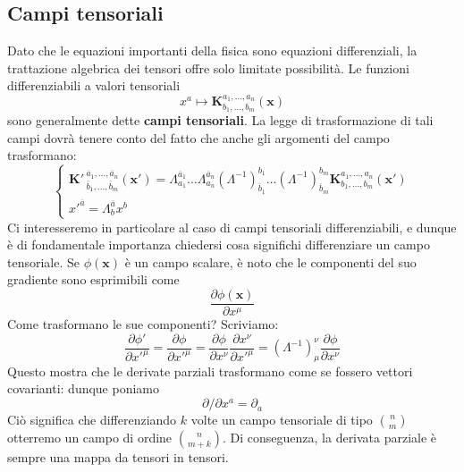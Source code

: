\documentclass[a4paper,11pt]{book}
\theoremstyle{plain}
\theoremstyle{definition}
\begin{document}
\subsection{Campi tensoriali}
Dato che le equazioni importanti della fisica sono equazioni differenziali, la trattazione 
algebrica dei tensori offre solo limitate possibilità. Le funzioni differenziabili a valori 
tensoriali 
\[
x^a \mapsto \textbf{K}^{a_1,\ldots,a_n}_{b_1,\ldots,b_m}(\textbf{x})
\]
sono generalmente dette \textbf{campi tensoriali}. La legge di trasformazione di tali campi dovrà tenere conto del fatto che anche gli argomenti del campo trasformano:
\[
\begin{cases}
\textbf{K}'\,^{\overline{a}_1,\ldots,\overline{a}_n}_{\overline{b}_1,\ldots,\overline{b}_m}(\textbf{x}') = \Lambda_{a_1}^{\overline{a}_1}\ldots\Lambda^{\overline{a}_n}_{a_n}(\Lambda^{-1})_{\overline{b}_1}^{b_1}\ldots(\Lambda^{-1})^{b_m}_{\overline{b}_m}\textbf{K}^{a_1,\ldots,a_n}_{b_1,\ldots,b_m}(\textbf{x}') \\
x'^{\overline{a}}=\Lambda_b^{\overline{a}}x^b
\end{cases}
\]
Ci interesseremo in particolare al caso di campi tensoriali differenziabili, e dunque è di fondamentale importanza chiedersi cosa significhi differenziare un campo tensoriale. Se $\phi (\textbf{x})$ è un campo scalare, è noto che le componenti del suo gradiente sono esprimibili come 
\[
\frac{\partial \phi(\textbf{x})}{\partial x^{\mu}}
\]
Come trasformano le sue componenti? Scriviamo:
\[
\frac{\partial \phi'}{\partial x'^{\mu}} = \frac{\partial \phi}{\partial x'^{\mu}}=\frac{\partial \phi}{\partial x^{\nu}}\frac{\partial x^{\nu}}{\partial x'^{\mu}} = (\Lambda^{-1})_{\mu}^{\nu}\frac{\partial \phi}{\partial x^{\nu}}
\]
Questo mostra che le derivate parziali trasformano come se fossero vettori covarianti: dunque poniamo
\[
\partial/\partial x^a = \partial _a
\]
Ciò significa che differenziando $k$ volte un campo tensoriale di tipo $\binom{n}{m}$ otterremo un campo di ordine $\binom{n}{m+k}$. Di conseguenza, la derivata parziale è sempre una mappa da tensori in tensori. 
\end{document}
